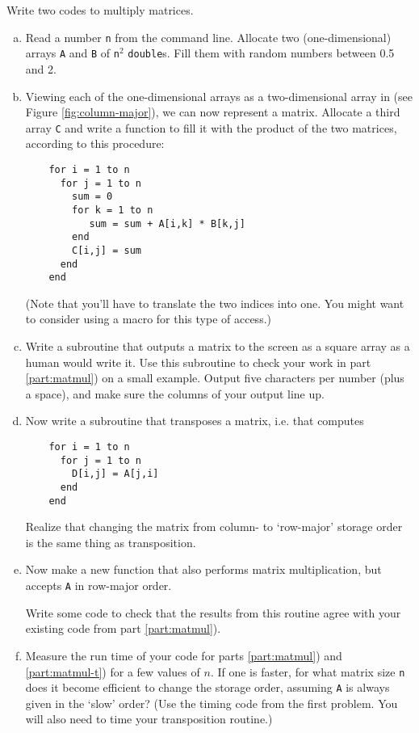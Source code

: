 \documentclass[11pt]{article}
\begin{document}
Write two codes to multiply matrices.
\begin{enumerate}[a)]
\item Read a number \texttt{n} from the command line.
  Allocate two (one-dimensional) arrays \texttt{A} and \texttt{B}
of \texttt{n}${}^2$ \texttt{double}s.  Fill them with random
numbers between 0.5 and 2.
\item \label{part:matmul}Viewing each of the one-dimensional arrays
  as a two-dimensional array in
  (see Figure \ref{fig:column-major}), we can now represent a matrix.
  Allocate a third array \texttt{C} and write a function to fill it
  with the product of the two matrices, according to this procedure:
  \begin{lstlisting}
    for i = 1 to n
      for j = 1 to n
        sum = 0
        for k = 1 to n
           sum = sum + A[i,k] * B[k,j]
        end
        C[i,j] = sum
      end
    end
  \end{lstlisting}
  (Note that you'll have to translate the two indices into one. You
  might want to consider using a macro for this type of access.)

\item \label{part:mat-output}Write a subroutine that outputs a matrix to the screen
  as a square array as a human would write it.
  Use this subroutine to check your work in part \ref{part:matmul})
  on a small example.
  Output five characters per number (plus a space), and make sure the
  columns of your output line up.

\item Now write a subroutine that transposes a matrix, i.e. that
  computes
  \begin{lstlisting}
    for i = 1 to n
      for j = 1 to n
        D[i,j] = A[j,i]
      end
    end
  \end{lstlisting}
  Realize that changing the matrix from column- to `row-major' storage
  order is the same thing as transposition.

\item \label{part:matmul-t} Now make a new function
  that also performs matrix multiplication, but accepts
  \texttt{A} in row-major order.

  Write some code to check that the results from this routine agree
  with your existing code from part \ref{part:matmul}).

\item \label{part:mat-perf}Measure the run time of your code for parts \ref{part:matmul})
  and \ref{part:matmul-t}) for a few values of $n$. If one is faster,
  for what matrix size \texttt{n} does it become efficient to change the
  storage order, assuming \texttt{A} is always given in the `slow'
  order? (Use the timing code from the first problem. You will also
  need to time your transposition routine.)


\end{enumerate}
\end{document}
